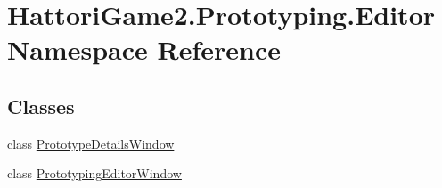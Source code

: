 \hypertarget{namespace_hattori_game2_1_1_prototyping_1_1_editor}{}\section{Hattori\+Game2.\+Prototyping.\+Editor Namespace Reference}
\label{namespace_hattori_game2_1_1_prototyping_1_1_editor}
\subsection*{Classes}
\begin{DoxyCompactItemize}
\item 
class \hyperlink{class_hattori_game2_1_1_prototyping_1_1_editor_1_1_prototype_details_window}{Prototype\+Details\+Window}
\item 
class \hyperlink{class_hattori_game2_1_1_prototyping_1_1_editor_1_1_prototyping_editor_window}{Prototyping\+Editor\+Window}
\end{DoxyCompactItemize}
